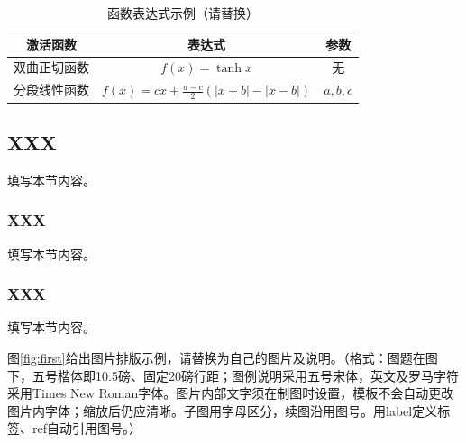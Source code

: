 \documentclass{研究生大论文模板}
\renewcommand{\thesistablecompact}{\thesistablenormal}
\begin{document}
\begin{table}[htbp]
\centering
\caption{函数表达式示例（请替换）}\label{tab:first}
\thesistablecompact %
\begin{tabular}{ccc}
\toprule
激活函数 & 表达式 & 参数\\
\midrule
双曲正切函数 & $f(x)=\tanh x$ & 无\\
分段线性函数 & $f(x)=cx+\frac{a-c}{2}(|x+b|-|x-b|)$ & $a,b,c$\\[2bp] %
\bottomrule
\end{tabular}
\end{table}

\subsection{XXX}
填写本节内容。

\subsubsection{XXX}
填写本节内容。

\subsubsection{XXX}
填写本节内容。

图\ref{fig:first}给出图片排版示例，请替换为自己的图片及说明。（格式：图题在图下，五号楷体即10.5磅、固定20磅行距；图例说明采用五号宋体，英文及罗马字符采用Times New Roman字体。图片内部文字须在制图时设置，模板不会自动更改图片内字体；缩放后仍应清晰。子图用字母区分，续图沿用图号。用label定义标签、ref自动引用图号。）

%
\end{document}
